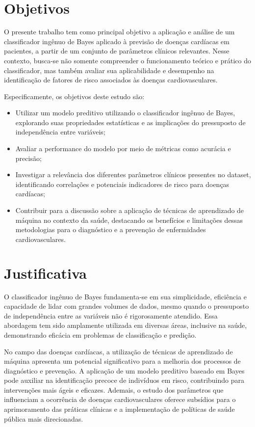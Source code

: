 \documentclass[conference]{IEEEtran}
\begin{document}
\section{Objetivos}
O presente trabalho tem como principal objetivo a aplicação e análise de um classificador ingênuo de Bayes aplicado à previsão de doenças cardíacas em pacientes, a partir de um conjunto de parâmetros clínicos relevantes. Nesse contexto, busca-se não somente compreender o funcionamento teórico e prático do classificador, mas também avaliar sua aplicabilidade e desempenho na identificação de fatores de risco associados às doenças cardiovasculares.

Especificamente, os objetivos deste estudo são:
\begin{itemize}
    \item Utilizar um modelo preditivo utilizando o classificador ingênuo de Bayes, explorando suas propriedades estatísticas e as implicações do pressuposto de independência entre variáveis;
    \item Avaliar a performance do modelo por meio de métricas como acurácia e precisão;
    \item Investigar a relevância dos diferentes parâmetros clínicos presentes no dataset, identificando correlações e potenciais indicadores de risco para doenças cardíacas;
    \item Contribuir para a discussão sobre a aplicação de técnicas de aprendizado de máquina no contexto da saúde, destacando os benefícios e limitações dessas metodologias para o diagnóstico e a prevenção de enfermidades cardiovasculares.
\end{itemize}

\section{Justificativa}
O classificador ingênuo de Bayes fundamenta-se em sua simplicidade, eficiência e capacidade de lidar com grandes volumes de dados, mesmo quando o pressuposto de independência entre as variáveis não é rigorosamente atendido. Essa abordagem tem sido amplamente utilizada em diversas áreas, inclusive na saúde, demonstrando eficácia em problemas de classificação e predição.

No campo das doenças cardíacas, a utilização de técnicas de aprendizado de máquina apresenta um potencial significativo para a melhoria dos processos de diagnóstico e prevenção. A aplicação de um modelo preditivo baseado em Bayes pode auxiliar na identificação precoce de indivíduos em risco, contribuindo para intervenções mais ágeis e eficazes. Ademais, o estudo dos parâmetros que influenciam a ocorrência de doenças cardiovasculares oferece subsídios para o aprimoramento das práticas clínicas e a implementação de políticas de saúde pública mais direcionadas.
\end{document}
